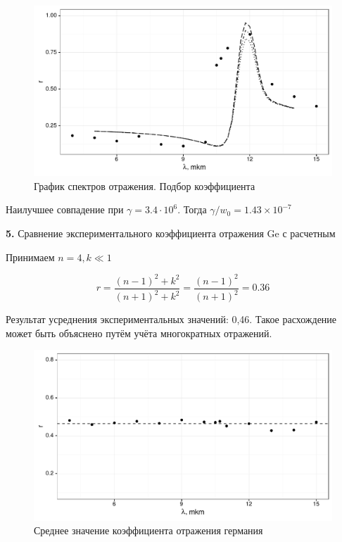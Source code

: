 \documentclass[a4paper,11pt]{report}\usepackage[]{graphicx}\usepackage[]{color}
\makeatletter
\def\maxwidth{ %
  \ifdim\Gin@nat@width>\linewidth
    \linewidth
  \else
    \Gin@nat@width
  \fi
}
\newenvironment{knitrout}{}{} %
\makeatother
\begin{document}
\begin{knitrout}
\color{fgcolor}\begin{figure}[!h]
\includegraphics[width=\maxwidth]{figure/rgraph53-1} \caption[График спектров отражения]{График спектров отражения. Подбор коэффициента }\label{fig:rgraph53}
\end{figure}


\end{knitrout}

Наилучшее совпадение  при $\gamma = 3.4 \cdot 10^6$.  Тогда $\gamma/w_0 = \ensuremath{1.43\times 10^{-7}} $




\textbf{5.} Сравнение экспериментального коэффициента отражения Ge с расчетным

Принимаем $n=4, k \ll 1 $

$$r = \frac{(n-1)^2+k^2}{(n+1)^2+k^2} = \frac{(n-1)^2}{(n+1)^2}=0.36$$

Результат усреднения экспериментальных значений: 0,46. Такое расхождение может быть объяснено путём учёта многократных отражений.


\begin{knitrout}
\color{fgcolor}\begin{figure}[!h]
\includegraphics[width=\maxwidth]{figure/rgraph54-1} \caption[Среднее значение коэффициента отражения германия]{Среднее значение коэффициента отражения германия}\label{fig:rgraph54}
\end{figure}


\end{knitrout}
\end{document}
